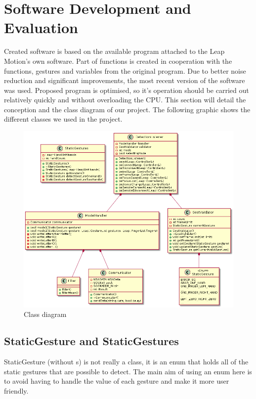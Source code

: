 \section{Software Development and Evaluation}

Created software is based on the available program attached to the Leap Motion's own software. Part of functions is created in cooperation with the functions, gestures and variables from the original program. Due to better noise reduction and significant improvements, the most recent version of the software was used. Proposed program is optimised, so it's operation should be carried out relatively quickly and without overloading the CPU.
This section will detail the conception and the class diagram of our project. The following graphic shows the different classes we used in the project. 

\begin{figure}[H]
 \centering
 \includegraphics[scale=0.5]{../uml/classDiagram.png}
 \caption{Class diagram}
\end{figure}

\subsection{StaticGesture and StaticGestures}

StaticGesture (without s) is not really a class, it is an enum that holds all of the static gestures that are possible to detect. The main aim of using an enum here is to avoid having to handle the value of each gesture and make it more user friendly.

